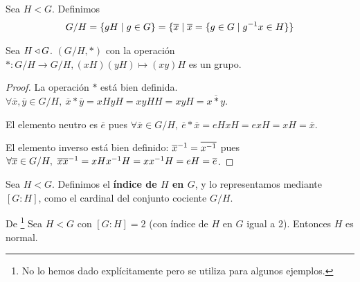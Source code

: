 \begin{dfn}
	Sea $H < G$. Definimos
	\begin{align}
	G/H = \{gH \mid g \in G\} = \{\overline{x} \mid \overline{x} = \{g \in G \mid g^{-1}x \in H\}\}
	\end{align}
\end{dfn}

\begin{pro}
	Sea $H \mathbin{\triangleleft} G$. $(G/H, \ast)$ con la operación $\ast: G/H \to G/H, (xH)(yH) \mapsto (xy)H$ es un grupo.
\end{pro}

\begin{proof}
	La operación $\ast$ está bien definida. $\forall \overline{x}, \overline{y} \in G/H,\ \overline{x} \ast \overline{y} = xHyH = xyHH = xyH = \overline{x \ast y}$.
	
	El elemento neutro es $\overline{e}$ pues $\forall \overline{x} \in G/H,\ \overline{e} \ast \overline{x} = eHxH = exH = xH = \overline{x}$.
	
	El elemento inverso está bien definido: $\overline{x}^{-1} = \overline{x^{-1}}$ pues $\forall \overline{x} \in G/H,\ \overline{x}\inv{\overline{x}} = xH \inv{x}H = x\inv{x}H = eH = \overline{e}$.
\end{proof}

\begin{dfn}[Índice]
	Sea $H < G$. Definimos el \textbf{índice de $H$ en $G$}, y lo representamos mediante $[G:H]$, como el cardinal del conjunto cociente $G/H$. \cite{dor96}
\end{dfn}

\begin{thm}
	\label{thm:indice2normal}
	De \cite{dor96}\footnote{No lo hemos dado explícitamente pero se utiliza para algunos ejemplos.}
	Sea $H < G$ con $[G : H] = 2$ (con índice de $H$ en $G$ igual a 2). Entonces $H$ es normal.
\end{thm}